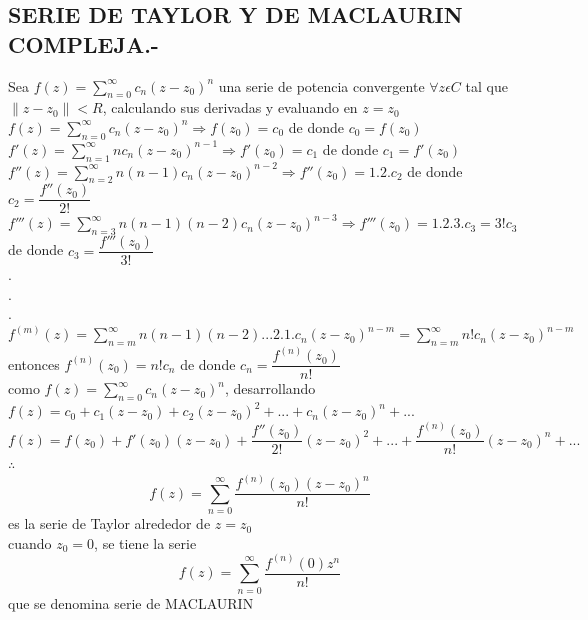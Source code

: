 \documentclass[10pt,a4paper]{article}
\begin{document}
\subsection{SERIE DE TAYLOR Y DE MACLAURIN COMPLEJA.-}
Sea  $\displaystyle{f(z) = \sum_{n = 0}^{\infty} c_n (z-z_0)^n}$ una serie de potencia convergente $\forall z \epsilon C$ tal que $\parallel z - z_0 \parallel < R$, calculando sus derivadas y evaluando en $z = z_0$ \\
$\displaystyle{f(z) = \sum_{n = 0}^{\infty} c_n (z-z_0)^n} \Rightarrow f(z_0) = c_0$ de donde $c_0 = f(z_0)$ \\
$\displaystyle{f'(z) = \sum_{n = 1}^{\infty} n c_n (z-z_0)^{n-1}} \Rightarrow f'(z_0) = c_1$ de donde $c_1 = f'(z_0)$ \\ 
$\displaystyle{f''(z) = \sum_{n = 2}^{\infty} n (n-1) c_n (z-z_0)^{n-2}} \Rightarrow f''(z_0) = 1.2.c_2$ de donde $c_2 = \dfrac{f''(z_0)}{2!}$ \\ 
$\displaystyle{f'''(z) = \sum_{n = 3}^{\infty} n (n-1)(n-2) c_n (z-z_0)^{n-3}} \Rightarrow f'''(z_0) = 1.2.3.c_3 = 3! c_3$ de donde $c_3 = \dfrac{f'''(z_0)}{3!}$ \\ 
.\\
.\\
.\\
$\displaystyle{f^{(m)}(z) = \sum_{n = m}^{\infty} n (n-1)(n-2)...2.1.c_n (z-z_0)^{n-m} = \sum_{n = m}^{\infty} n! c_n (z-z_0)^{n-m}}$ entonces  $f^(n) (z_0) = n! c_n$ de donde $c_n = \dfrac{f^{(n)} (z_0)}{n!}$ \\
como  $\displaystyle{f(z) = \sum_{n = 0}^{\infty} c_n (z-z_0)^n}$, desarrollando \\
$\displaystyle{f(z) = c_0 + c_1 (z-z_0) + c_2 (z-z_0)^2 + ... + c_n(z-z_0)^n+...}$\\
$\displaystyle{f(z) = f(z_0) +f'(z_0)(z-z_0) + \dfrac{f''(z_0)}{2!}(z-z_0)^2 + ... + \dfrac{f^{(n)}(z_0)}{n!}(z-z_0)^n+ ... }$\\

$\therefore$ \begin{equation}
f(z) = \sum_{n = 0}^{\infty} \dfrac{f^{(n)} (z_0)(z-z_0)^n}{n!}
\end{equation}
es la serie de Taylor alrededor de $z = z_0$\\
cuando $z_0 = 0$, se tiene la serie \begin{equation}
f(z) = \sum_{n = 0}^{\infty} \dfrac{f^{(n)}(0) z^n}{n!}
\end{equation}
que se denomina serie de MACLAURIN
\end{document}
